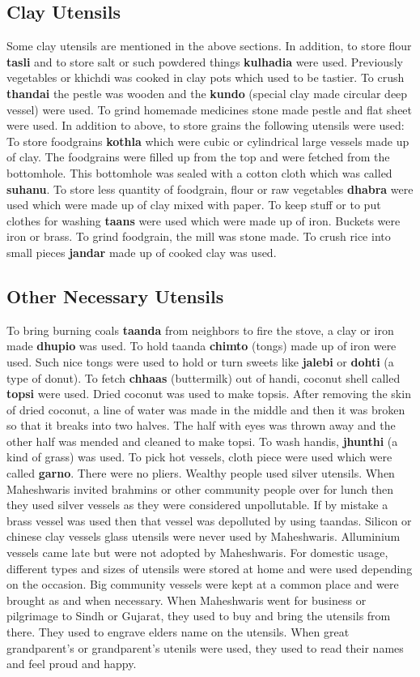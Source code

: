 \subsection{Clay Utensils}
Some clay utensils are mentioned in the above sections. In addition, to store
flour \textbf{tasli} and to store salt or such powdered things \textbf{kulhadia}
were used.
Previously vegetables or khichdi was cooked in clay pots which used to be
tastier.
To crush \textbf{thandai} the pestle was wooden and the
\textbf{kundo} (special clay made circular deep vessel) were used.
To grind homemade medicines stone made pestle and flat sheet were used.
In addition to above, to store grains the following utensils were used:
To store foodgrains \textbf{kothla} which were cubic or cylindrical large
vessels made up of clay. The foodgrains were filled up from the top and were
fetched from the bottomhole. This bottomhole was sealed with a cotton cloth
which was called \textbf{suhanu}.
To store less quantity of foodgrain, flour or raw vegetables \textbf{dhabra}
were used which were made up of clay mixed with paper.
To keep stuff or to put clothes for washing \textbf{taans} were used which were
made up of iron.
Buckets were iron or brass.
To grind foodgrain, the mill was stone made.
To crush rice into small pieces \textbf{jandar} made up of cooked clay was used.
\subsection{Other Necessary Utensils}
To bring burning coals \textbf{taanda} from neighbors to fire the stove, a clay or iron made
\textbf{dhupio} was used.
To hold taanda \textbf{chimto} (tongs) made up of iron were used. Such nice
tongs were used to hold or turn sweets like \textbf{jalebi} or \textbf{dohti} (a type of
donut).
To fetch \textbf{chhaas} (buttermilk) out of handi, coconut shell called
\textbf{topsi} were used. Dried coconut was used to make topsis. After removing
the skin of dried coconut, a line of water was made in the middle and then it
was broken so that it breaks into two halves. The half with eyes was thrown away
and the other half was mended and cleaned to make topsi.
To wash handis, \textbf{jhunthi} (a kind of grass) was used.
To pick hot vessels, cloth piece were used which were called \textbf{garno}.
There were no pliers. Wealthy people used silver utensils. When Maheshwaris
invited brahmins or other community people over for lunch then they used silver
vessels as they were considered unpollutable. If by mistake a brass vessel was
used then that vessel was depolluted by using taandas.
Silicon or chinese clay vessels glass utensils were never used by Maheshwaris.
Alluminium vessels came late but were not adopted by Maheshwaris. For domestic
usage, different types and sizes of utensils were stored at home and were used
depending on the occasion. Big community vessels were kept at a common place and
were brought as and when necessary.
When Maheshwaris went for business or pilgrimage to Sindh or Gujarat, they used
to buy and bring the utensils from there. They used to engrave elders name on
the utensils. When great grandparent's or grandparent's utenils were used, they
used to read their names and feel proud and happy.

